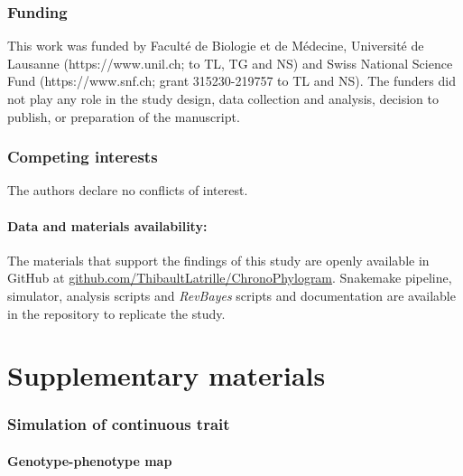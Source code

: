 \documentclass{article}
\renewcommand{\baselinestretch}{1.3}
\begin{document}
\section*{Funding}
This work was funded by Faculté de Biologie et de Médecine, Université de Lausanne (https://www.unil.ch; to TL, TG and NS) and Swiss National Science Fund (https://www.snf.ch; grant 315230-219757 to TL and NS). The funders did not play any role in the study design, data collection and analysis, decision to publish, or preparation of the manuscript.

\section*{Competing interests}
The authors declare no conflicts of interest.

\subsection*{Data and materials availability:}
The materials that support the findings of this study are openly available in GitHub at \href{https://github.com/ThibaultLatrille/ChronoPhylogram}{github.com/ThibaultLatrille/ChronoPhylogram}.
Snakemake pipeline, simulator, analysis scripts and \textit{RevBayes} scripts and documentation are available in the repository to replicate the study.

\printbibliography

\newpage

\part*{Supplementary materials}
\renewcommand{\thetable}{S\arabic{table}}
\renewcommand{\thefigure}{S\arabic{figure}}
\setcounter{figure}{0}
\setcounter{table}{0}
\setcounter{section}{0}

\renewcommand{\baselinestretch}{1.0}\normalsize
\tableofcontents
\renewcommand{\baselinestretch}{1.5}\normalsize

\section{Simulation of continuous trait}\label{sec:simulator}

\subsection{Genotype-phenotype map}\label{subsec:genotype-phenotype-map}
\end{document}
